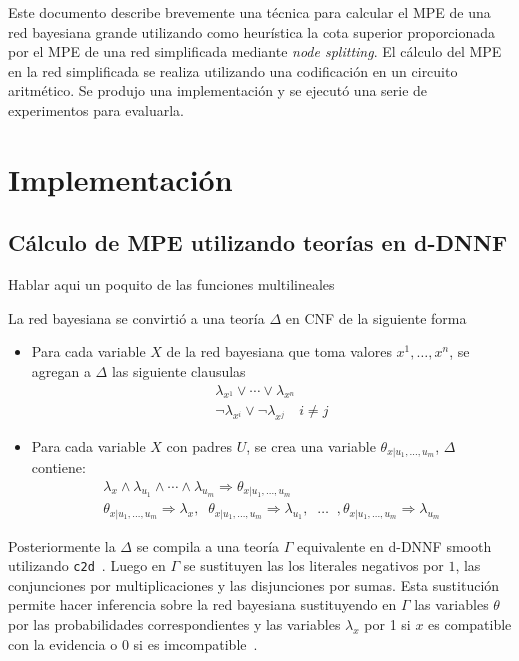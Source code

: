 \documentclass[11pt, letterpaper]{article}
\begin{document}
Este documento describe brevemente una técnica
para calcular el MPE
de una red bayesiana grande utilizando como heurística la cota superior
proporcionada por el MPE de una red simplificada mediante \emph{node splitting}.
El cálculo del MPE en la red simplificada se realiza utilizando una
codificación en un circuito aritmético. Se produjo una implementación y se
ejecutó una serie de experimentos para evaluarla.

\section{Implementación}

\subsection{Cálculo de MPE utilizando teorías en d-DNNF}
\label{sec:condificacion}
Hablar aqui un poquito de las funciones multilineales

La red bayesiana se convirtió a una teoría $\Delta$ en CNF de la
siguiente forma
\begin{itemize}
\item Para cada variable $X$ de la red bayesiana que toma valores
  $x^1,\dots,x^n$, se agregan a $\Delta$ las siguiente clausulas
  \begin{align}
    \lambda_{x^1} \lor \cdots \lor \lambda_{x^n} \label{eq:cnf1} \\
    \neg\lambda_{x^i} \lor \neg\lambda_{x^j} \quad i\neq j \label{eq:cnf2}
  \end{align}
\item Para cada variable $X$ con padres $U$, se crea una variable
  $\theta_{x|u_1,\dots,u_m}$, $\Delta$
  contiene:
  \begin{align}
    \lambda_{x} \land \lambda_{u_1} \land \cdots \land \lambda_{u_m} \Rightarrow \theta_{x|u_1,\dots,u_m} \label{eq::cnf3}\\
    \theta_{x|u_1,\dots,u_m} \Rightarrow \lambda_{x}, \;\; \theta_{x|u_1,\dots,u_m} \Rightarrow \lambda_{u_1} ,\;\; \dots \;\;, \theta_{x|u_1,\dots,u_m} \Rightarrow \lambda_{u_m} \label{eq:cnf4}
  \end{align}
\end{itemize}

Posteriormente la $\Delta$ se compila a una teoría $\Gamma$
equivalente en d-DNNF smooth utilizando
\texttt{c2d}~{\cite{darwicheAAAI02}}. Luego en $\Gamma$ se sustituyen
las los literales negativos por $1$, las conjunciones por
multiplicaciones y las disjunciones por sumas. Esta sustitución
permite hacer inferencia sobre la red bayesiana sustituyendo en
$\Gamma$ las variables $\theta$ por las probabilidades
correspondientes y las variables $\lambda_x$ por 1 si $x$ es
compatible con la evidencia o 0 si es imcompatible~\cite{Darwiche01alogical}.
\end{document}
